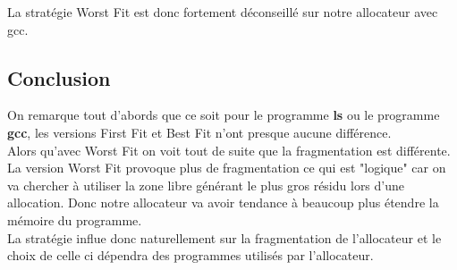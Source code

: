 \documentclass{article}
\begin{document}
La stratégie Worst Fit est donc fortement déconseillé sur notre allocateur avec gcc.

\subsection{Conclusion}

On remarque tout d'abords que ce soit pour le programme \textbf{ls} ou le programme \textbf{gcc}, les versions First Fit et Best Fit n'ont presque aucune différence.\\
Alors qu'avec Worst Fit on voit tout de suite que la fragmentation est différente.\\

La version Worst Fit provoque plus de fragmentation ce qui est "logique" car on va chercher à utiliser la zone libre générant le plus gros résidu lors d'une allocation. Donc notre allocateur va avoir tendance à beaucoup plus étendre la mémoire du programme.\\

La stratégie influe donc naturellement sur la fragmentation de l'allocateur et le choix de celle ci dépendra des programmes utilisés par l'allocateur.
\end{document}
